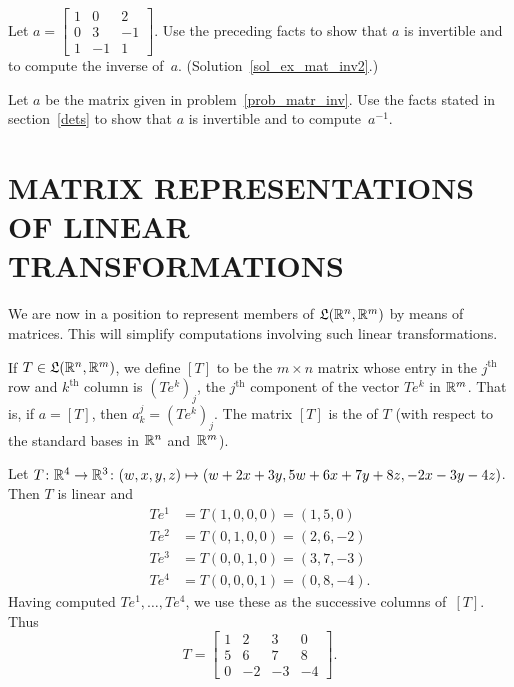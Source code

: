 \begin{exer}\label{ex_mat_inv2} Let $a =
         \begin{bmatrix}
               1  &  0  &  2 \\
               0  &  3  & -1 \\
               1  & -1  &  1
         \end{bmatrix}$. Use the preceding facts to show that $a$ is invertible and to compute
the inverse of~$a$.  (Solution~\ref{sol_ex_mat_inv2}.)

\end{exer}

\begin{prob}  Let $a$ be the matrix given in problem~\ref{prob_matr_inv}.  Use the facts stated in
section~\ref{dets} to show that $a$ is invertible and to compute~$a^{-1}$.
\end{prob}









\section{MATRIX REPRESENTATIONS OF LINEAR TRANSFORMATIONS}  We are now in a position to represent
members of $\mathfrak{L}(\mathbb{R}^n,\mathbb{R}^m)$ by means of matrices.  This will simplify computations
involving such linear transformations.

\begin{defn} If $T \in \mathfrak{L}(\mathbb{R}^n,\mathbb{R}^m)$, we define $[T]$ to be the $m \times n$ matrix whose
entry in the $j^{\text{th}}$ row and $k^{\text{th}}$ column is $(Te^k)_j$, the $j^{\text{th}}$
component of the vector $Te^k$ in $\mathbb{R}^m$.  That is, if $a = [T]$, then $a_k^j = (Te^k)_j$.
The matrix
$[T]$ is the
 of $T$ (with respect to the standard bases in $\mathbb{R}^n$ and~$\mathbb{R}^m$).
\end{defn}

\begin{exam}  Let $T \colon \mathbb{R}^4 \rightarrow \mathbb{R}^3 \colon  (w,x,y,z) \mapsto (w+2x+3y, 5w+6x+7y+8z,
-2x-3y-4z)$.  Then $T$ is linear and
 \begin{align*}
      Te^1 &= T(1,0,0,0) = (1,5,0)  \\
      Te^2 &= T(0,1,0,0) = (2,6,-2) \\
      Te^3 &= T(0,0,1,0) = (3,7,-3) \\
      Te^4 &= T(0,0,0,1) = (0,8,-4).
 \end{align*}
Having computed $Te^1,\dots, Te^4$, we use these as the successive columns of~$[T]$.  Thus
 \[ T = \begin{bmatrix}
             1 &  2 &  3 &  0 \\
             5 &  6 &  7 &  8 \\
             0 & -2 & -3 & -4
        \end{bmatrix}. \]
\end{exam}

